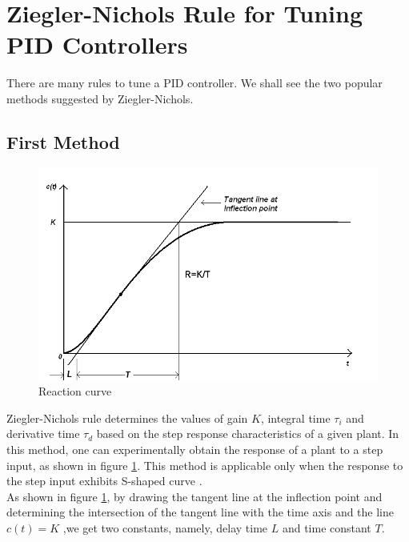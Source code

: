 \section{Ziegler-Nichols Rule for Tuning PID Controllers}
There are many rules to tune a PID controller. We shall see the two popular methods suggested by Ziegler-Nichols.
\subsection{First Method}
\begin{figure}
\centering
\includegraphics[width=\linewidth]{pid_manual/ReacCurve}
\caption{Reaction curve \cite{kmmdc09}}
\label{RC}
\end{figure}
Ziegler-Nichols rule determines the values of gain $K$, integral time $\tau_i$ and derivative time $\tau_d$ based on 
the step response characteristics of a given plant. In this method, one can experimentally obtain the response of a plant 
to a step input, as shown in figure \ref{RC}. This method is applicable only when the response to the step input exhibits 
S-shaped curve \cite{ogt05}.\\
As shown in figure \ref{RC}, by drawing the tangent line at the inflection point and determining the intersection of the 
tangent line with the time axis and the line $c(t)= K$ ,we get two constants, namely, delay time $L$ and time constant $T$.

